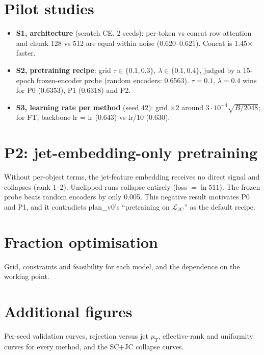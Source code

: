 \documentclass[11pt,a4paper]{article}
\newcommand{\LJC}{\mathcal{L}_{\mathrm{JC}}}
\newcommand{\pT}{\ensuremath{p_{\mathrm{T}}}}
\begin{document}
\section{Pilot studies}
\label{app:pilots}
\begin{itemize}
  \item \textbf{S1, architecture} (scratch CE, 2 seeds): per-token vs concat row attention
        and chunk 128 vs 512 are equal within noise (0.620--0.621). Concat is 1.45$\times$
        faster.
  \item \textbf{S2, pretraining recipe}: grid $\tau\in\{0.1,0.3\}$, $\lambda\in\{0.1,0.4\}$,
        judged by a 15-epoch frozen-encoder probe (random encoders: 0.6563). $\tau=0.1$,
        $\lambda=0.4$ wins for P0 (0.6353), P1 (0.6318) and P2.
  \item \textbf{S3, learning rate per method} (seed 42): grid $\times2$ around
        $3\cdot10^{-4}\sqrt{B/2048}$; for FT, backbone lr = lr (0.643) vs lr/10 (0.630).
\end{itemize}

\section{P2: jet-embedding-only pretraining}
\label{app:p2}
Without per-object terms, the jet-feature embedding receives no direct signal and collapses
(rank 1--2). Unclipped runs collapse entirely (loss $=\ln 511$). The frozen probe beats
random encoders by only 0.005. This negative result motivates P0 and P1, and it contradicts
plan\_v0's ``pretraining on $\LJC$'' as the default recipe.

\section{Fraction optimisation}
\label{app:fractions}
Grid, constraints and feasibility for each model, and the dependence on the working point.

\section{Additional figures}
Per-seed validation curves, rejection versus jet \pT, effective-rank and uniformity curves
for every method, and the SC+JC collapse curves.



\end{document}
